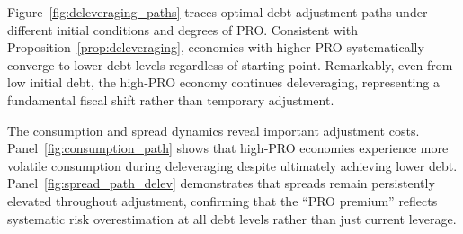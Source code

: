 \documentclass[12pt]{article}
\theoremstyle{plain}
\begin{document}
Figure~\ref{fig:deleveraging_paths} traces optimal debt adjustment paths under
different initial conditions and degrees of PRO. Consistent with
Proposition~\ref{prop:deleveraging}, economies with higher PRO systematically
converge to lower debt levels regardless of starting point. Remarkably, even
from low initial debt, the high‑PRO economy continues deleveraging,
representing a fundamental fiscal shift rather than temporary adjustment.

The consumption and spread dynamics reveal important adjustment costs.
Panel~\ref{fig:consumption_path} shows that high‑PRO economies experience more
volatile consumption during deleveraging despite ultimately achieving lower
debt. Panel~\ref{fig:spread_path_delev} demonstrates that spreads remain
persistently elevated throughout adjustment, confirming that the ``PRO
premium'' reflects systematic risk overestimation at all debt levels rather
than just current leverage.
\end{document}
